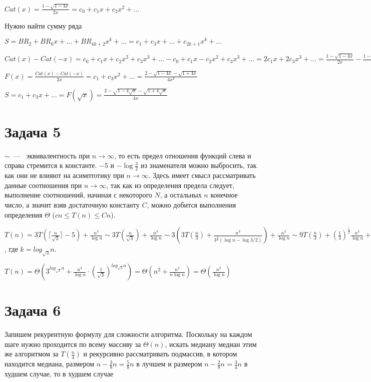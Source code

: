 \documentclass[a4paper,12pt]{article} %
\begin{document}
$Cat(x)=\frac{1-\sqrt{1-4x}}{2x}=c_0+c_1x+c_2x^2+\ldots$

Нужно найти сумму ряда

$S=BR_{2}+BR_6x+\ldots+BR_{4k+2}x^k+\ldots=c_{1}+c_3x+\ldots+c_{2k+1}x^k+\ldots$

$Cat(x)-Cat(-x)=c_0+c_1x+c_2x^2+c_3x^3+\ldots-c_0+c_1x-c_2x^2+c_3x^3+\ldots=2c_1x+2c_3x^3+\ldots=\frac{1-\sqrt{1-4x}}{2x}-\frac{1-\sqrt{1+4x}}{-2x}=\frac{2-\sqrt{1-4x}-\sqrt{1+4x}}{2x}$

$F(x)=\frac{Cat(x)-Cat(-x)}{2x}=c_1+c_3x^2+\ldots=\frac{2-\sqrt{1-4x}-\sqrt{1+4x}}{4x^2}$

$S=c_1+c_3x+\ldots=F(\sqrt{x})=\frac{2-\sqrt{1-4\sqrt{x}}-\sqrt{1+4\sqrt{x}}}{4x}$


\section{Задача 5}
\hspace{5mm}
$\sim$~---~ эквивалентность при $n\rightarrow\infty$, то есть предел отношения функций слева и справа стремится к константе. $-5$ и $-\log{\frac{3}{2}}$ из знаменателя можно выбросить, так как они не влияют на асимптотику при $n\rightarrow\infty$. Здесь имеет смысл рассматривать данные соотношения при $n\rightarrow\infty$, так как из определения предела следует, выполнение соотношений, начиная с некоторого $N$, а остальных $n$ конечное число, а значит взяв достаточную константу $C$, можно добится выполнения определения $\Theta$ ($cn\leq T(n)\leq Cn$).

$T(n)=3T(\lceil\frac{n}{\sqrt{3}}\rceil-5)+\frac{n^3}{\log{n}}
\sim3T(\frac{n}{\sqrt{3}})+\frac{n^3}{\log{n}}\sim
3(3T(\frac{n}{3})+\frac{n^3}{3^{\frac{3}{2}}(\log{n}-\log{3/2})})+\frac{n^3}{\log{n}}\sim
9T(\frac{n}{3})+({\frac{1}{3}})^{\frac{1}{2}}\frac{n^3}{\log{n}}+\frac{n^3}{\log{n}})\sim\ldots\sim
(3^{k}T(\frac{n}{3^k})+\frac{n^3}{\log{n}}\cdot (1+({\frac{1}{3}})^{\frac{1}{2}}+\ldots+({\frac{1}{3}})^{\frac{1}{2}k})\sim
(3^k T(1)+\frac{n^3}{\log{n}}\cdot \Theta(({\frac{1}{\sqrt{3}}})^{k})$, где $k=log_{\sqrt{3}}{n}$.

$T(n)=\Theta(3^{log_{\sqrt{3}}{n}}+\frac{n^3}{\log{n}}\cdot ({\frac{1}{\sqrt{3}}})^{log_{\sqrt{3}}{n}})=\Theta(n^2+\frac{n^3}{n\log{n}})=\Theta(\frac{n^2}{\log{n}})$

\section{Задача 6}
\hspace{5mm}
Запишем рекурентную формулу для сложности алгоритма. Поскольку на каждом шаге нужно проходится по всему массиву за $\Theta(n)$, искать медиану медиан этим же алгоритмом за $T(\frac{n}{4})$ и рекурсивно рассматривать подмассив, в котором находится медиана, размером $n-\frac{3}{8}n=\frac{5}{8}n$ в лучшем и размером $n-\frac{2}{8}n=\frac{3}{4}n$ в худшем случае, то в худшем случае 
\end{document}

